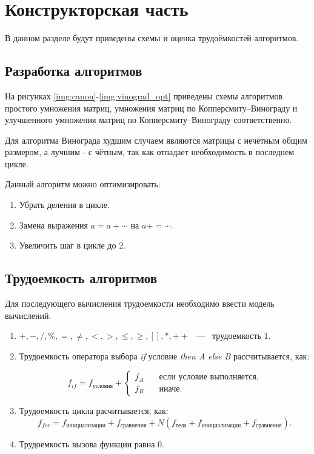 \section{Конструкторская часть}
В данном разделе будут приведены схемы и оценка трудоёмкостей алгоритмов.

\subsection{Разработка алгоритмов}

На рисунках \ref{img:canon}-\ref{img:vinograd_opt} приведены схемы алгоритмов простого умножения матриц, умножения матриц по Копперсмиту–Винограду и улучшенного умножения матриц по Копперсмиту–Винограду соответственно.

Для алгоритма Винограда худшим случаем являются матрицы с нечётным общим размером, а лучшим - с чётным, так как отпадает необходимость в последнем цикле.

Данный алгоритм можно оптимизировать:

\begin{enumerate}
    \item Убрать деления в цикле.
    \item Замена выражения $a = a + \cdots $ на $a += \cdots$.
    \item Увеличить шаг в цикле до 2.
\end{enumerate}

\subsection{Трудоемкость алгоритмов}

Для последующего вычисления трудоемкости необходимо ввести модель вычислений.

\begin{enumerate}
    \item $+, -, /, \%, =, \neq, <, >, \leq, \geq, [ ], *, ++$ ~---~ трудоемкость 1.
    \item Трудоемкость оператора выбора \textit{if} условие \textit{then A else B} рассчитывается, как:

    \begin{equation}
        f_{if} = f_{\text{условия}} + \begin{cases}
                                f_A & \quad \text{если условие выполняется,} \\
                                f_B & \quad \text{иначе}.
                                \end{cases}
    \end{equation}

    \item Трудоемкость цикла расчитывается, как:
    \begin{equation}
        f_{for} = f_{\text{инициализации}} + f_{\text{сравнения}} + N(f_{\text{тела}} + f_{\text{инициализации}} + f_{\text{сравнения}}).
    \end{equation}

    \item Трудоемкость вызова функции равна 0.
\end{enumerate}


